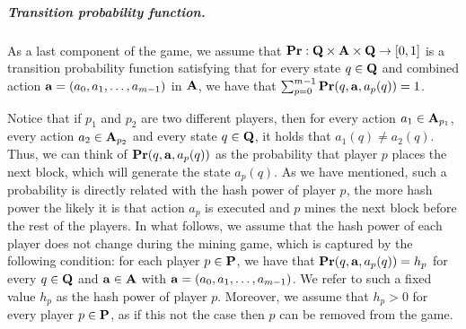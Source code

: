 \subparagraph*{Transition probability function.} %
As a last component of the game, we assume that $\mathbf{Pr} : \mathbf{Q} \times \mathbf{A} \times \mathbf{Q} \to [0,1]$ is a transition probability function satisfying that for every state $q \in \mathbf{Q}$ and combined action $\mathbf{a} = (a_0, a_1, \ldots, a_{m-1})$ in $\mathbf{A}$, we have that $\sum_{p=0}^{m-1} \mathbf{Pr}(q, \mathbf{a}, a_p(q)) = 1$.

Notice that if $p_1$ and $p_2$ are two different players, then for every action $a_1 \in \mathbf{A}_{p_1}$, every action $a_2 \in \mathbf{A}_{p_2}$ and every state $q \in \mathbf{Q}$, it holds that $a_1(q) \neq a_2(q)$. Thus, we can think of $\mathbf{Pr}(q, \mathbf{a}, a_p(q))$ as the probability that player $p$ places the next block, which will generate the state $a_p(q)$. As we have mentioned, such a probability is directly related with the hash power of player $p$, the more hash power the likely it is that action $a_p$ is executed and $p$ mines the next block before the rest of the players. In what follows, we assume that the hash power of each player does not change during the mining game, which is captured by the following condition:
for each player $p \in \mathbf{P}$, we 
have that $\mathbf{Pr}(q, \mathbf{a}, a_p(q)) = h_p$ for every $q \in \mathbf{Q}$ and $\mathbf{a} \in \mathbf{A}$ with $\mathbf{a} = (a_0, a_1, \ldots, a_{m-1})$. We refer to such a fixed value $h_p$ 
as the hash power of player $p$.
Moreover, we assume that $h_p > 0$ for every player $p \in \mathbf{P}$, as if this not the case then $p$ can be removed from the game.



